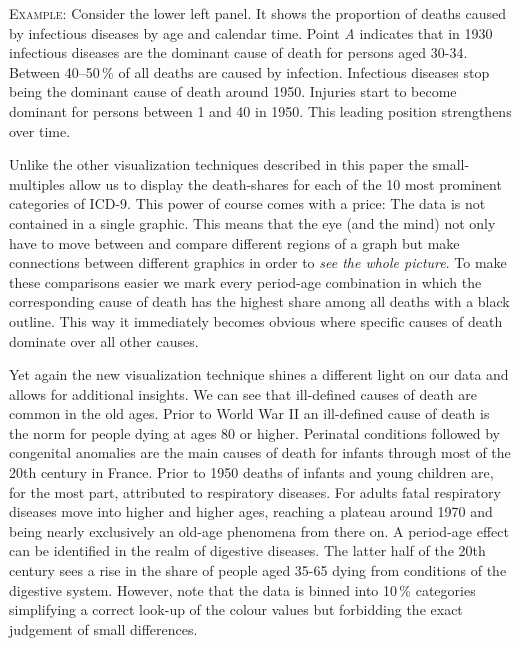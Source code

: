 \documentclass[a4paper]{scrartcl}
\begin{document}
\textsc{Example:} Consider the lower left panel. It shows the proportion of deaths caused by infectious diseases by age and calendar time. Point \emph{A} indicates that in 1930 infectious diseases are the dominant cause of death for persons aged 30-34. Between 40--50\,\% of all deaths are caused by infection. Infectious diseases stop being the dominant cause of death around 1950. Injuries start to become dominant for persons between 1 and 40 in 1950. This leading position strengthens over time.

Unlike the other visualization techniques described in this paper the small-multiples allow us to display the death-shares for each of the 10 most prominent categories of ICD-9. This power of course comes with a price: The data is not contained in a single graphic. This means that the eye (and the mind) not only have to move between and compare different regions of a graph but make connections between different graphics in order to \emph{see the whole picture}. To make these comparisons easier we mark every period-age combination in which the corresponding cause of death has the highest share among all deaths with a black outline. This way it immediately becomes obvious where specific causes of death dominate over all other causes.

Yet again the new visualization technique shines a different light on our data and allows for additional insights. We can see that ill-defined causes of death are common in the old ages. Prior to World War II an ill-defined cause of death is the norm for people dying at ages 80 or higher. Perinatal conditions followed by congenital anomalies are the main causes of death for infants through most of the 20th century in France. Prior to 1950 deaths of infants and young children are, for the most part, attributed to respiratory diseases. For adults fatal respiratory diseases move into higher and higher ages, reaching a plateau around 1970 and being nearly exclusively an old-age phenomena from there on. A period-age effect can be identified in the realm of digestive diseases. The latter half of the 20th century sees a rise in the share of people aged 35-65 dying from conditions of the digestive system. However, note that the data is binned into 10\,\% categories simplifying a correct look-up of the colour values but forbidding the exact judgement of small differences.
\end{document}
